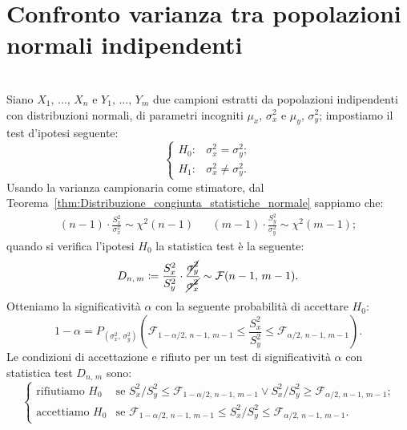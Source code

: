     \section{Confronto varianza tra popolazioni normali indipendenti}
        \begin{defn}[$\mu_x =\mu_y =\,?,\, \sigma^2_x =\sigma^2_y =\,?$]
            \hfill \\
            Siano $X_1,\, \ldots,\, X_{n}$ e $Y_1,\, \ldots,\, Y_{m}$ due campioni estratti da 
            popolazioni indipendenti con distribuzioni normali, di parametri incogniti 
            $\mu_x,\,\sigma^2_x$ e $\mu_y,\,\sigma^2_y$; impostiamo il test d'ipotesi seguente: \[
                \begin{cases}
                    H_0 : & \sigma^2_x = \sigma^2_y; \\
                    H_1 : & \sigma^2_x \neq \sigma^2_y.
                \end{cases}
            \] Usando la varianza campionaria come stimatore, dal 
            Teorema~\ref{thm:Distribuzione_congiunta_statistiche_normale} sappiamo che:
            \begin{align*}
                (n-1)\cdot \frac{S_x^2}{\sigma_x^2} \sim \chi^2(n-1) & &
                (m-1)\cdot \frac{S_y^2}{\sigma_y^2} \sim \chi^2(m-1)
            ;\end{align*}
            quando si verifica l'ipotesi $H_0$ la statistica test è la seguente: \[
                D_{n,\,m} \coloneqq \frac{S_x^2}{S_y^2} \cdot \frac{\cancel{\sigma_y^2}}{\cancel{\sigma_x^2}} 
                \sim \mathcal{F}(n-1,\,m-1)
            .\] Otteniamo la significatività $\alpha$ con la seguente probabilità di accettare $H_0$: \[
            1-\alpha = P_{(\sigma_x^2,\,\sigma_y^2)}\left(\mathcal{F}_{1-\alpha /2,\,n-1,\,m-1} \leq 
            \frac{S_x^2}{S_y^2} \leq \mathcal{F}_{\alpha /2,\,n-1,\,m-1}\right)
            .\] Le condizioni di accettazione e rifiuto per un test di significatività $\alpha$ con 
            statistica test $D_{n,\,m}$ sono: \[
            \begin{cases}
                \text{rifiutiamo } H_0 & 
                \text{se $S_x^2 /S_y^2 \leq \mathcal{F}_{1-\alpha /2,\,n-1,\,m-1} \lor
                S_x^2 /S_y^2 \geq \mathcal{F}_{\alpha /2,\,n-1,\,m-1}$;} \\
                \text{accettiamo } H_0 & 
                \text{se $\mathcal{F}_{1-\alpha /2,\,n-1,\,m-1} \leq S_x^2 /S_y^2
                \leq \mathcal{F}_{\alpha /2,\,n-1,\,m-1}$.}
            \end{cases}
            \] 
        \end{defn}

